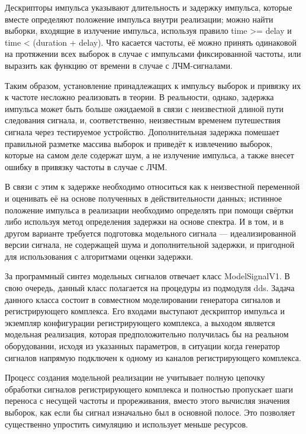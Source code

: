 \documentclass{report}
\begin{document}
Дескрипторы импульса указывают длительность и задержку импульса, которые вместе определяют положение импульса внутри реализации; можно найти выборки, входящие в излучение импульса, используя правило time >= delay и time < (duration + delay). Что касается частоты, её можно принять одинаковой на протяжении всех выборок в случае с импульсами фиксированной частоты, или выразить как функцию от времени в случае с ЛЧМ-сигналами.

Таким образом, установление принадлежащих к импульсу выборок и привязку их к частоте несложно реализовать в теории. В реальности, однако, задержка импульса может быть больше ожидаемой в связи с неизвестной длиной пути следования сигнала, и, соответственно, неизвестным временем путешествия сигнала через тестируемое устройство. Дополнительная задержка помешает правильной разметке массива выборок и приведёт к извлечению выборок, которые на самом деле содержат шум, а не излучение импульса, а также внесет ошибку в привязку частоты в случае с ЛЧМ.

В связи с этим к задержке необходимо относиться как к неизвестной переменной и оценивать её на основе полученных в действительности данных; истинное положение импульса в реализации необходимо определять при помощи свёртки либо используя метод определения задержки на основе спектра. И в том, и в другом варианте требуется подготовка модельного сигнала --- идеализированной версии сигнала, не содержащей шума и дополнительной задержки, и пригодной для использования с алгоритмами оценки задержки.

За программный синтез модельных сигналов отвечает класс ModelSignalV1. В свою очередь, данный класс полагается на процедуры из подмодуля dds. Задача данного класса состоит в совместном моделировании генератора сигналов и регистрирующего комплекса. Его входами выступают дескриптор импульса и экземпляр конфигурации регистрирующего комплекса, а выходом является модельная реализация, которая предположительно получилась бы на реальном оборудовании, исходя из указанных параметров, в ситуации когда генератор сигналов напрямую подключен к одному из каналов регистрирующего комплекса.

Процесс создания модельной реализации не учитывает полную цепочку обработки сигналов регистрирующего комплекса и полностью пропускает шаги переноса с несущей частоты и прореживания, вместо этого вычисляя значения выборок, как если бы сигнал изначально был в основной полосе. Это позволяет существенно упростить симуляцию и использует меньше ресурсов.
\end{document}
